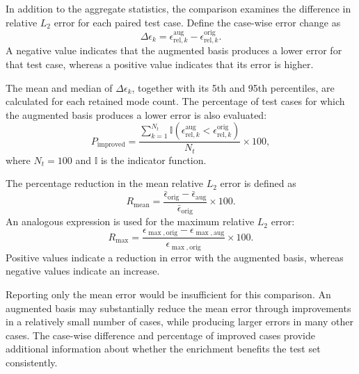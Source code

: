 In addition to the aggregate statistics, the comparison
examines the difference in relative $L_2$ error for each
paired test case. Define the case-wise error change as
\begin{equation}
    \boxed{
    \Delta\epsilon_k
    =
    \epsilon_{\mathrm{rel},k}^{\mathrm{aug}}
    -
    \epsilon_{\mathrm{rel},k}^{\mathrm{orig}}.
    }
    \label{eq:casewise_error_change}
\end{equation}
A negative value indicates that the augmented basis
produces a lower error for that test case, whereas a
positive value indicates that its error is higher.

The mean and median of $\Delta\epsilon_k$, together
with its 5th and 95th percentiles, are calculated for
each retained mode count. The percentage of test cases
for which the augmented basis produces a lower error
is also evaluated:
\begin{equation}
    \boxed{
    P_{\mathrm{improved}}
    =
    \frac{
    \displaystyle\sum_{k=1}^{N_t}
    \mathbb{I}
    \left(
    \epsilon_{\mathrm{rel},k}^{\mathrm{aug}}
    <
    \epsilon_{\mathrm{rel},k}^{\mathrm{orig}}
    \right)
    }{N_t}
    \times100,
    }
    \label{eq:percentage_improved}
\end{equation}
where $N_t=100$ and $\mathbb{I}$ is the indicator
function.

The percentage reduction in the mean relative $L_2$
error is defined as
\begin{equation}
    \boxed{
    R_{\mathrm{mean}}
    =
    \frac{
    \bar{\epsilon}_{\mathrm{orig}}
    -
    \bar{\epsilon}_{\mathrm{aug}}
    }{
    \bar{\epsilon}_{\mathrm{orig}}
    }\times100.
    }
    \label{eq:mean_error_reduction}
\end{equation}
An analogous expression is used for the maximum relative
$L_2$ error:
\begin{equation}
    R_{\max}
    =
    \frac{
    \epsilon_{\max,\mathrm{orig}}
    -
    \epsilon_{\max,\mathrm{aug}}
    }{
    \epsilon_{\max,\mathrm{orig}}
    }\times100.
    \label{eq:maximum_error_reduction}
\end{equation}
Positive values indicate a reduction in error with the
augmented basis, whereas negative values indicate an
increase.

Reporting only the mean error would be insufficient for
this comparison. An augmented basis may substantially
reduce the mean error through improvements in a relatively
small number of cases, while producing larger errors in
many other cases. The case-wise difference and percentage
of improved cases provide additional information about
whether the enrichment benefits the test set consistently.

